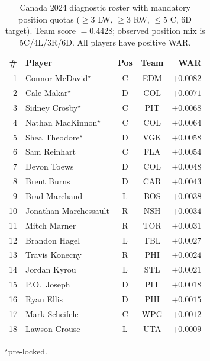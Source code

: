 \documentclass[11pt,letterpaper]{article}
\begin{document}
\begin{table}[h]
  \centering
  \small
  \caption{Canada 2024 diagnostic roster with mandatory position quotas
    ($\geq 3$ LW, $\geq 3$ RW, $\leq 5$ C, 6D target). Team score
    $= 0.4428$; observed position mix is 5C/4L/3R/6D. All players have
    positive WAR.}
  \begin{tabular}{r l c c r}
    \toprule
    \# & Player & Pos & Team & WAR \\
    \midrule
    1  & Connor McDavid$^{\star}$        & C & EDM & $+0.0082$ \\
    2  & Cale Makar$^{\star}$            & D & COL & $+0.0071$ \\
    3  & Sidney Crosby$^{\star}$         & C & PIT & $+0.0068$ \\
    4  & Nathan MacKinnon$^{\star}$      & C & COL & $+0.0064$ \\
    5  & Shea Theodore$^{\star}$         & D & VGK & $+0.0058$ \\
    6  & Sam Reinhart                    & C & FLA & $+0.0054$ \\
    7  & Devon Toews                     & D & COL & $+0.0048$ \\
    8  & Brent Burns                     & D & CAR & $+0.0043$ \\
    9  & Brad Marchand                   & L & BOS & $+0.0038$ \\
    10 & Jonathan Marchessault           & R & NSH & $+0.0034$ \\
    11 & Mitch Marner                    & R & TOR & $+0.0031$ \\
    12 & Brandon Hagel                   & L & TBL & $+0.0027$ \\
    13 & Travis Konecny                  & R & PHI & $+0.0024$ \\
    14 & Jordan Kyrou                    & L & STL & $+0.0021$ \\
    15 & P.O.\ Joseph                    & D & PIT & $+0.0018$ \\
    16 & Ryan Ellis                      & D & PHI & $+0.0015$ \\
    17 & Mark Scheifele                  & C & WPG & $+0.0012$ \\
    18 & Lawson Crouse                   & L & UTA & $+0.0009$ \\
    \bottomrule
  \end{tabular}
  \par \footnotesize{$^{\star}$pre-locked.}
\end{table}
\end{document}
